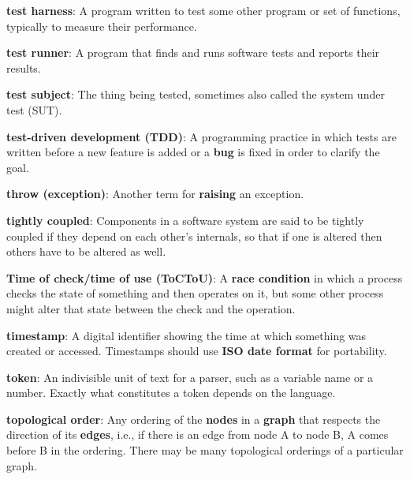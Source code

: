 \documentclass[krantzl]{krantz}
\newcommand{\glosskey}[1]{\textbf{#1}}
\begin{document}
\noindent \textbf{{\newline}\glosskey{test harness}}: 
A program written to test some other program or set of functions, typically to measure their performance.


\noindent \textbf{{\newline}\glosskey{test runner}}: 
A program that finds and runs software tests and reports their results.


\noindent \textbf{{\newline}\glosskey{test subject}}: 
The thing being tested, sometimes also called the system under test (SUT).


\noindent \textbf{{\newline}\glosskey{test-driven development} (TDD)}: 
A programming practice in which tests are written before a new feature is added or a \glosskey{bug} is fixed in order to clarify the goal.


\noindent \textbf{{\newline}\glosskey{throw (exception)}}: 
Another term for \glosskey{raising} an exception.


\noindent \textbf{{\newline}\glosskey{tightly coupled}}: 
Components in a software system are said to be tightly coupled if they depend on each other’s internals, so that if one is altered then others have to be altered as well.


\noindent \textbf{{\newline}\glosskey{Time of check/time of use} (ToCToU)}: 
A \glosskey{race condition} in which a process checks the state of something and then operates on it, but some other process might alter that state between the check and the operation.


\noindent \textbf{{\newline}\glosskey{timestamp}}: 
A digital identifier showing the time at which something was created or accessed. Timestamps should use \glosskey{ISO date format} for portability.


\noindent \textbf{{\newline}\glosskey{token}}: 
An indivisible unit of text for a parser, such as a variable name or a number. Exactly what constitutes a token depends on the language.


\noindent \textbf{{\newline}\glosskey{topological order}}: 
Any ordering of the \glosskey{nodes} in a \glosskey{graph} that respects the direction of its \glosskey{edges}, i.e., if there is an edge from node A to node B, A comes before B in the ordering. There may be many topological orderings of a particular graph.
\end{document}
